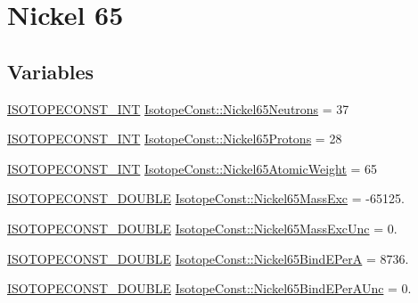 \hypertarget{group___isotope_const-_nickel-_ni65}{}\section{Nickel 65}
\label{group___isotope_const-_nickel-_ni65}
\subsection*{Variables}
\begin{DoxyCompactItemize}
\item 
\mbox{\hyperlink{group___isotope_const-_macros_ga5f18360b3e99483a35c32d789e62621c}{I\+S\+O\+T\+O\+P\+E\+C\+O\+N\+S\+T\+\_\+\+I\+NT}} \mbox{\hyperlink{group___isotope_const-_nickel-_ni65_ga3b7030d3cb3b34f8fae9f1fef11c3316}{Isotope\+Const\+::\+Nickel65\+Neutrons}} = 37
\item 
\mbox{\hyperlink{group___isotope_const-_macros_ga5f18360b3e99483a35c32d789e62621c}{I\+S\+O\+T\+O\+P\+E\+C\+O\+N\+S\+T\+\_\+\+I\+NT}} \mbox{\hyperlink{group___isotope_const-_nickel-_ni65_gab940b9d83fe1884dc3c862e64dadc2df}{Isotope\+Const\+::\+Nickel65\+Protons}} = 28
\item 
\mbox{\hyperlink{group___isotope_const-_macros_ga5f18360b3e99483a35c32d789e62621c}{I\+S\+O\+T\+O\+P\+E\+C\+O\+N\+S\+T\+\_\+\+I\+NT}} \mbox{\hyperlink{group___isotope_const-_nickel-_ni65_ga21fcd37ca1e464f4ec65f6c97b46c91b}{Isotope\+Const\+::\+Nickel65\+Atomic\+Weight}} = 65
\item 
\mbox{\hyperlink{group___isotope_const-_macros_ga8f45a7272ce02c0b4c65c44636ed719a}{I\+S\+O\+T\+O\+P\+E\+C\+O\+N\+S\+T\+\_\+\+D\+O\+U\+B\+LE}} \mbox{\hyperlink{group___isotope_const-_nickel-_ni65_gaace1752d35aa6371bb152a1ccf972e3b}{Isotope\+Const\+::\+Nickel65\+Mass\+Exc}} = -\/65125.
\item 
\mbox{\hyperlink{group___isotope_const-_macros_ga8f45a7272ce02c0b4c65c44636ed719a}{I\+S\+O\+T\+O\+P\+E\+C\+O\+N\+S\+T\+\_\+\+D\+O\+U\+B\+LE}} \mbox{\hyperlink{group___isotope_const-_nickel-_ni65_gad3c11ee2824cd29de7da56aa28f03afd}{Isotope\+Const\+::\+Nickel65\+Mass\+Exc\+Unc}} = 0.
\item 
\mbox{\hyperlink{group___isotope_const-_macros_ga8f45a7272ce02c0b4c65c44636ed719a}{I\+S\+O\+T\+O\+P\+E\+C\+O\+N\+S\+T\+\_\+\+D\+O\+U\+B\+LE}} \mbox{\hyperlink{group___isotope_const-_nickel-_ni65_ga23374d4b457246c561bf774474ce6b38}{Isotope\+Const\+::\+Nickel65\+Bind\+E\+PerA}} = 8736.
\item 
\mbox{\hyperlink{group___isotope_const-_macros_ga8f45a7272ce02c0b4c65c44636ed719a}{I\+S\+O\+T\+O\+P\+E\+C\+O\+N\+S\+T\+\_\+\+D\+O\+U\+B\+LE}} \mbox{\hyperlink{group___isotope_const-_nickel-_ni65_ga0aac2b2d1bbbea5bb31a30bfca8a8f59}{Isotope\+Const\+::\+Nickel65\+Bind\+E\+Per\+A\+Unc}} = 0.

\end{DoxyCompactItemize}
